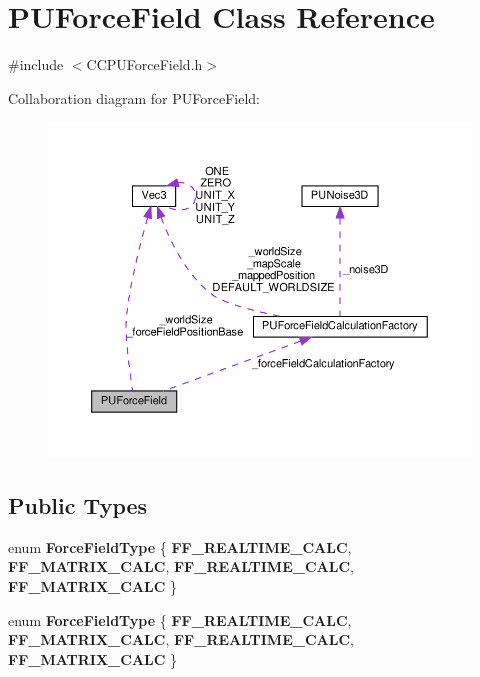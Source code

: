 \hypertarget{classPUForceField}{}\section{P\+U\+Force\+Field Class Reference}
\label{classPUForceField}


{\ttfamily \#include $<$C\+C\+P\+U\+Force\+Field.\+h$>$}



Collaboration diagram for P\+U\+Force\+Field\+:
\nopagebreak
\begin{figure}[H]
\begin{center}
\leavevmode
\includegraphics[width=350pt]{classPUForceField__coll__graph}
\end{center}
\end{figure}
\subsection*{Public Types}
\begin{DoxyCompactItemize}
\item 
\mbox{\label{classPUForceField_a855cda976c34a492069df4aa40bde866}} 
enum {\bfseries Force\+Field\+Type} \{ {\bfseries F\+F\+\_\+\+R\+E\+A\+L\+T\+I\+M\+E\+\_\+\+C\+A\+LC}, 
{\bfseries F\+F\+\_\+\+M\+A\+T\+R\+I\+X\+\_\+\+C\+A\+LC}, 
{\bfseries F\+F\+\_\+\+R\+E\+A\+L\+T\+I\+M\+E\+\_\+\+C\+A\+LC}, 
{\bfseries F\+F\+\_\+\+M\+A\+T\+R\+I\+X\+\_\+\+C\+A\+LC}
 \}
\item 
\mbox{\label{classPUForceField_a855cda976c34a492069df4aa40bde866}} 
enum {\bfseries Force\+Field\+Type} \{ {\bfseries F\+F\+\_\+\+R\+E\+A\+L\+T\+I\+M\+E\+\_\+\+C\+A\+LC}, 
{\bfseries F\+F\+\_\+\+M\+A\+T\+R\+I\+X\+\_\+\+C\+A\+LC}, 
{\bfseries F\+F\+\_\+\+R\+E\+A\+L\+T\+I\+M\+E\+\_\+\+C\+A\+LC}, 
{\bfseries F\+F\+\_\+\+M\+A\+T\+R\+I\+X\+\_\+\+C\+A\+LC}
 \}
\end{DoxyCompactItemize}
